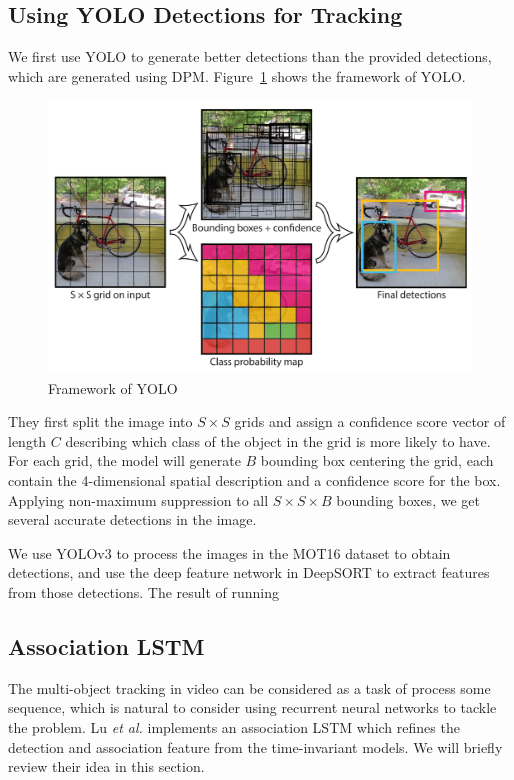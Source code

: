 \documentclass[conference]{IEEEtran}
\begin{document}
\subsection{Using YOLO Detections for Tracking}
We first use YOLO\cite{redmon2016you} to generate better detections than the provided detections, which are generated using DPM.
Figure~\ref{fig:yolo} shows the framework of YOLO.

\begin{figure}[h]
    \centering
    \includegraphics[width=\linewidth]{fig/yolo.png}
    \caption{Framework of YOLO\protect\footnotemark}
    \label{fig:yolo}
\end{figure}

They first split the image into $S \times S$ grids and assign a confidence score vector of length $C$ describing which class of the object in the grid is more likely to have.
For each grid, the model will generate $B$ bounding box centering the grid, each contain the 4-dimensional spatial description and a confidence score for the box.
Applying non-maximum suppression to all $S \times S \times B$ bounding boxes, we get several accurate detections in the image.

We use YOLOv3\cite{yolov3} to process the images in the MOT16 dataset to obtain detections, and use the deep feature network in DeepSORT to extract features from those detections.
The result of running 

\subsection{Association LSTM}
The multi-object tracking in video can be considered as a task of process some sequence, which is natural to consider using recurrent neural networks to tackle the problem.
Lu \textit{et al.} \cite{lu2017online} implements an association LSTM which refines the detection and association feature from the time-invariant models.
We will briefly review their idea in this section.
\end{document}
